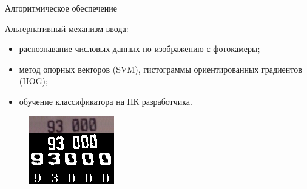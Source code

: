 \documentclass[hyperref={pdftex,unicode}]{beamer}
\begin{document}
\begin{frame}{Алгоритмическое обеспечение}
  \begin{minipage}{0.55\linewidth}
  Альтернативный механизм ввода:
  \begin{itemize}
    \item распознавание числовых данных по изображению с фотокамеры;
    \item метод опорных векторов (SVM), гистограммы ориентированных градиентов (HOG);
    \item обучение классификатора на ПК разработчика.
  \end{itemize}
  \end{minipage}
  \hfill
  \begin{minipage}{0.35\linewidth}
    \begin{figure}[h!]
      \centering
      \includegraphics[width=\textwidth]{fig/implementation_cv_recognition.png}
    \end{figure}
  \end{minipage}
\end{frame}
\end{document}
